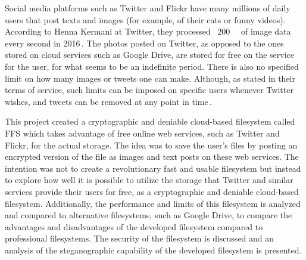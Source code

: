 Social media platforms such as Twitter and Flickr have many millions of daily users that post texts and images (for example, of their cats or funny videos). According to Henna Kermani at Twitter, they processed ~\SI{200}{\giga\byte} of image data every second in 2016\,\cite{MobileScaleLondona}. The photos posted on Twitter, as opposed to the ones stored on cloud services such as Google Drive, are stored for free on the service for the user, for what seems to be an indefinite period. There is also no specified limit on how many images or tweets one can make. Although, as stated in their terms of service, such limits can be imposed on specific users whenever Twitter wishes, and tweets can be removed at any point in time\,\cite{twitterTwitterTermsService2021}.

This project created a cryptographic and deniable \mbox{cloud-based} filesystem called \gls{FFS} which takes advantage of free online web services, such as Twitter and Flickr, for the actual storage. The idea was to save the user's files by posting an encrypted version of the file as images and text posts on these web services. The intention was not to create a revolutionary fast and usable filesystem but instead to explore how well it is possible to utilize the storage that Twitter and similar services provide their users for free, as a cryptographic and deniable \mbox{cloud-based} filesystem. Additionally, the performance and limits of this filesystem is analyzed and compared to alternative filesystems, such as Google Drive, to compare the advantages and disadvantages of the developed filesystem compared to professional filesystems. The security of the filesystem is discussed and an analysis of the steganographic capability of the developed filesystem is presented.

%  











